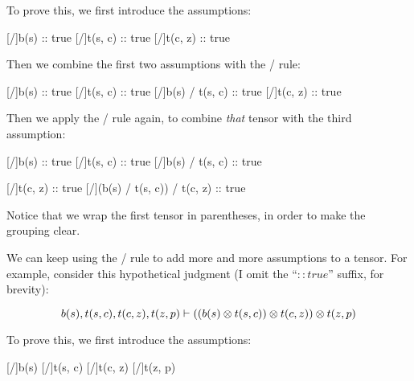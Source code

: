 \documentclass[../../../main.tex]{subfiles}
\begin{document}
\noindent
To prove this, we first introduce the assumptions:

\begin{prooftree*}
  \hypo{}
  [\startrule/]{b(s) :: true}
  \hypo{}
  [\startrule/]{t(s, c) :: true}
  \hypo{}
  [\startrule/]{t(c, z) :: true}  
\end{prooftree*}

\noindent
Then we combine the first two assumptions with the \tensorIntro/ rule:

\begin{prooftree*}
  \hypo{}
  [\startrule/]{b(s) :: true}
  \hypo{}
  [\startrule/]{t(s, c) :: true}
  [\tensorIntro/]{b(s) \tensor/ t(s, c) :: true}
  \hypo{}
  [\startrule/]{t(c, z) :: true}  
\end{prooftree*}

\noindent
Then we apply the \tensorIntro/ rule again, to combine \emph{that} tensor with the third assumption:

\begin{prooftree*}
  \hypo{}
  [\startrule/]{b(s) :: true}
  \hypo{}
  [\startrule/]{t(s, c) :: true}
  [\tensorIntro/]{b(s) \tensor/ t(s, c) :: true}
  
  \hypo{}
  [\startrule/]{t(c, z) :: true}  
  [\tensorIntro/]{(b(s) \tensor/ t(s, c)) \tensor/ t(c, z) :: true}
\end{prooftree*}

\noindent
Notice that we wrap the first tensor in parentheses, in order to make the grouping clear.

We can keep using the \tensorIntro/ rule to add more and more assumptions to a tensor. For example, consider this hypothetical judgment (I omit the ``$:: true$'' suffix, for brevity):

\begin{equation*}
  b(s), t(s, c), t(c, z), t(z, p) \ndturnstile/ ((b(s) \tensor/ t(s, c)) \tensor/ t(c, z)) \tensor/ t(z, p)
\end{equation*}

\noindent
To prove this, we first introduce the assumptions:

\begin{prooftree*}
  \hypo{}
  [\startrule/]{b(s)}
  \hypo{}
  [\startrule/]{t(s, c)}
  \hypo{}
  [\startrule/]{t(c, z)}
  \hypo{}
  [\startrule/]{t(z, p)}
\end{prooftree*}
\end{document}
